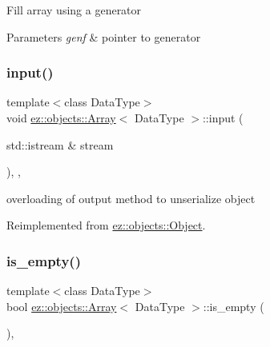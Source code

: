 Fill array using a generator 
\begin{DoxyParams}{Parameters}
{\em genf} & pointer to generator \\
\hline
\end{DoxyParams}
\mbox{\label{classez_1_1objects_1_1Array_a438c2c6187dd5cce0dae9f303b34609c}} 
\subsubsection{\texorpdfstring{input()}{input()}}
{\footnotesize\ttfamily template$<$class Data\+Type$>$ \\
void \hyperlink{classez_1_1objects_1_1Array}{ez\+::objects\+::\+Array}$<$ Data\+Type $>$\+::input (\begin{DoxyParamCaption}\item[{std\+::istream \&}]{stream }\end{DoxyParamCaption})\hspace{0.3cm}{\ttfamily [inline]}, {\ttfamily [override]}, {\ttfamily [virtual]}}

overloading of output method to unserialize object 

Reimplemented from \hyperlink{classez_1_1objects_1_1Object_a878bdc53b7f16fda6fa15dab214c4b6a}{ez\+::objects\+::\+Object}.

\mbox{\label{classez_1_1objects_1_1Array_a281b310f3f9f4140520b84c2315b1352}} 
\subsubsection{\texorpdfstring{is\+\_\+empty()}{is\_empty()}}
{\footnotesize\ttfamily template$<$class Data\+Type$>$ \\
bool \hyperlink{classez_1_1objects_1_1Array}{ez\+::objects\+::\+Array}$<$ Data\+Type $>$\+::is\+\_\+empty (\begin{DoxyParamCaption}{ }\end{DoxyParamCaption})\hspace{0.3cm}{\ttfamily [inline]}, {\ttfamily [virtual]}}

